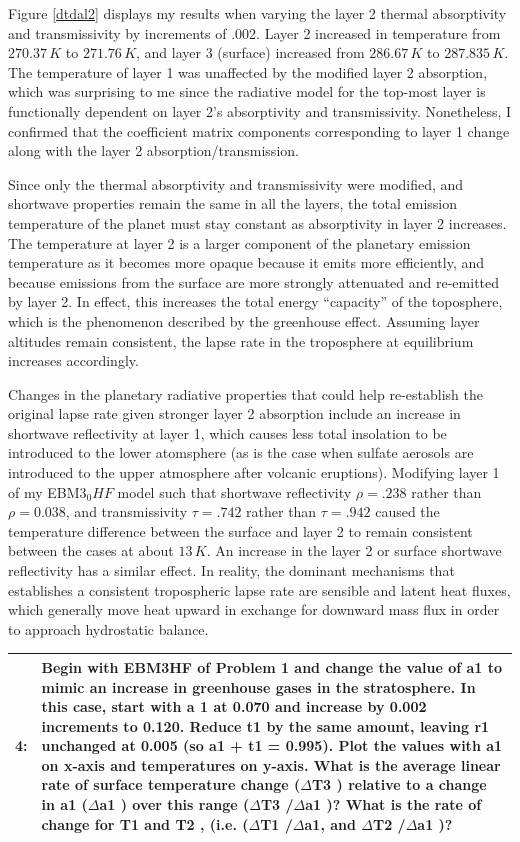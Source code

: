 \documentclass[12pt]{article}
\newcommand*{\problem}[2]{
    \begin{table}[ht]
    \centering
        \begin{tabular}{ | p{.1\linewidth} p{.9\linewidth} | }
            \hline
            \vspace{.3em}\textbf{\large#1:} & \vspace{.3em}\footnotesize{#2}\hspace{.2em}\vspace{.5em} \\ \hline
        \end{tabular}
    \end{table}
}
\begin{document}
Figure \ref{dtdal2} displays my results when varying the layer 2 thermal absorptivity and transmissivity by increments of .002.  Layer 2 increased in temperature from $270.37\,\si{K}$ to $271.76\,\si{K}$, and layer 3 (surface) increased from $286.67\,\si{K}$ to $287.835\,\si{K}$. The temperature of layer 1 was unaffected by the modified layer 2 absorption, which was surprising to me since the radiative model for the top-most layer is functionally dependent on layer 2's absorptivity and transmissivity. Nonetheless, I confirmed that the coefficient matrix components corresponding to layer 1 change along with the layer 2 absorption/transmission.

Since only the thermal absorptivity and transmissivity were modified, and shortwave properties remain the same in all the layers, the total emission temperature of the planet must stay constant as absorptivity in layer 2 increases. The temperature at layer 2 is a larger component of the planetary emission temperature as it becomes more opaque because it emits more efficiently, and because emissions from the surface are more strongly attenuated and re-emitted by layer 2. In effect, this increases the total energy ``capacity'' of the toposphere, which is the phenomenon described by the greenhouse effect. Assuming layer altitudes remain consistent, the lapse rate in the troposphere at equilibrium increases accordingly.

Changes in the planetary radiative properties that could help re-establish the original lapse rate given stronger layer 2 absorption include an increase in shortwave reflectivity at layer 1, which causes less total insolation to be introduced to the lower atomsphere (as is the case when sulfate aerosols are introduced to the upper atmosphere after volcanic eruptions). Modifying layer 1 of my EBM3$_0HF$ model such that shortwave reflectivity $\rho = .238$ rather than $\rho = 0.038$, and transmissivity $\tau = .742$ rather than $\tau=.942$ caused the temperature difference between the surface and layer 2 to remain consistent between the cases at about $13\,\si{K}$. An increase in the layer 2 or surface shortwave reflectivity has a similar effect. In reality, the dominant mechanisms that establishes a consistent tropospheric lapse rate are sensible and latent heat fluxes, which generally move heat upward in exchange for downward mass flux in order to approach hydrostatic balance.

\problem{4}{
    Begin with EBM3HF of Problem 1 and change the value of a1 to mimic an increase in
    greenhouse gases in the stratosphere. In this case, start with a 1 at 0.070 and increase by 0.002
    increments to 0.120. Reduce t1 by the same amount, leaving r1 unchanged at 0.005 (so a1 + t1 = 0.995).
    Plot the values with a1 on x-axis and temperatures on y-axis.
    What is the average linear rate of surface temperature change ($\Delta$T3 ) relative to a change in a1
    ($\Delta$a1 ) over this range ($\Delta$T3 /$\Delta$a1 )?
    What is the rate of change for T1 and T2 , (i.e. ($\Delta$T1 /$\Delta$a1, and $\Delta$T2 /$\Delta$a1 )?}
\end{document}
